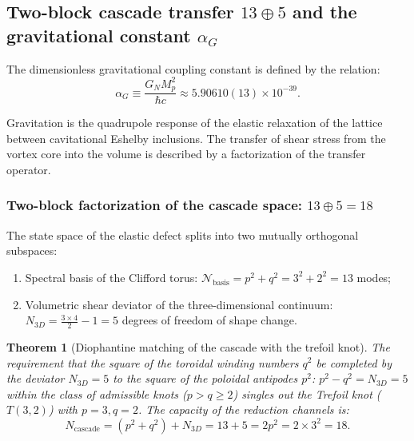 \documentclass[11pt,a4paper]{article}
\newtheorem{theorem}{Theorem}
\theoremstyle{definition}
\theoremstyle{remark}
\begin{document}
\subsection{Two-block cascade transfer $13 \oplus 5$ and the gravitational constant $\alpha_G$}

The dimensionless gravitational coupling constant is defined by the relation:
\begin{equation}
	\alpha_G \equiv \frac{G_N M_p^2}{\hbar c} \approx 5.90610(13) \times 10^{-39}.
\label{eq:alpha_G_definition_ratio}
\end{equation}

Gravitation is the quadrupole response of the elastic relaxation of the lattice between cavitational Eshelby inclusions. The transfer of shear stress from the vortex core into the volume is described by a factorization of the transfer operator.

\subsubsection{Two-block factorization of the cascade space: $13 \oplus 5 = 18$}

The state space of the elastic defect splits into two mutually orthogonal subspaces:
\begin{enumerate}
\item Spectral basis of the Clifford torus: $\mathcal{N}_{\mathrm{basis}} = p^2 + q^2 = 3^2 + 2^2 = 13$ modes;
\item Volumetric shear deviator of the three-dimensional continuum: $N_{3D} = \frac{3 \times 4}{2} - 1 = 5$ degrees of freedom of shape change.
\end{enumerate}

\begin{theorem}[Diophantine matching of the cascade with the trefoil knot]
\label{thm:diophantine_cascade_trefoil}
The requirement that the square of the toroidal winding numbers $q^2$ be completed by the deviator $N_{3D} = 5$ to the square of the poloidal antipodes $p^2$: $p^2 - q^2 = N_{3D} = 5$ within the class of admissible knots ($p > q \ge 2$) singles out the Trefoil knot ($T(3,2)$) with $p = 3, q = 2$. The capacity of the reduction channels is:
\begin{equation}
	N_{\mathrm{cascade}} = (p^2 + q^2) + N_{3D} = 13 + 5 = 2p^2 = 2 \times 3^2 = 18.
\label{eq:cascade_power_eighteen}
\end{equation}
\end{theorem}
\end{document}
